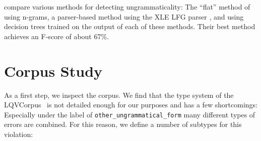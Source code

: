 \documentclass[a4paper,10pt]{scrartcl}
\theoremstyle{style}
\begin{document}
\cite{wagner2007comparative} compare various methods for detecting ungrammaticality: The ``flat'' method of using n-grams, a parser-based method using the XLE LFG parser \citep{maxwell1996efficient}, and using decision trees trained on the output of each of these methods. Their best method achieves an F-score of about 67\%.

\section{Corpus Study}

As a first step, we inspect the corpus. We find that the type system of the LQVCorpus~\citep{valeeva} is not detailed enough for our purposes and has a few shortcomings: Especially under the label of \texttt{other\_ungrammatical\_form} many different types of errors are combined. For this reason, we define a number of subtypes for this violation:
\end{document}
